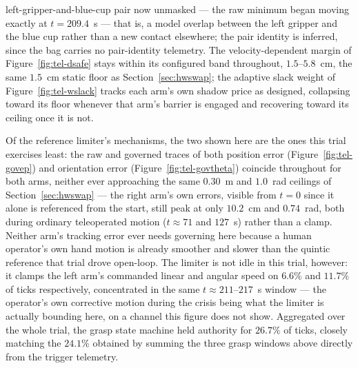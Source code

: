 \documentclass[12pt,a4paper,twoside,openright]{report}
\begin{document}
left-gripper-and-blue-cup pair now unmasked --- the raw minimum began moving exactly at $t=209.4$~s --- that is, a model overlap between the left gripper and the blue cup rather than a new contact elsewhere; the pair identity is inferred, since the bag carries no pair-identity telemetry. The velocity-dependent margin of Figure~\ref{fig:tel-dsafe} stays within its configured band throughout, $1.5$--$5.8$~cm, the same $1.5$~cm static floor as Section~\ref{sec:hwswap}; the adaptive slack weight of Figure~\ref{fig:tel-wslack} tracks each arm's own shadow price as designed, collapsing toward its floor whenever that arm's barrier is engaged and recovering toward its ceiling once it is not.

Of the reference limiter's mechanisms, the two shown here are the ones this trial exercises least: the raw and governed traces of both position error (Figure~\ref{fig:tel-govep}) and orientation error (Figure~\ref{fig:tel-govtheta}) coincide throughout for both arms, neither ever approaching the same $0.30$~m and $1.0$~rad ceilings of Section~\ref{sec:hwswap} --- the right arm's own errors, visible from $t=0$ since it alone is referenced from the start, still peak at only $10.2$~cm and $0.74$~rad, both during ordinary teleoperated motion ($t\approx71$ and $127$~s) rather than a clamp. Neither arm's tracking error ever needs governing here because a human operator's own hand motion is already smoother and slower than the quintic reference that trial drove open-loop. The limiter is not idle in this trial, however: it clamps the left arm's commanded linear and angular speed on $6.6\%$ and $11.7\%$ of ticks respectively, concentrated in the same $t\approx211$--$217$~s window --- the operator's own corrective motion during the crisis being what the limiter is actually bounding here, on a channel this figure does not show. Aggregated over the whole trial, the grasp state machine held authority for $26.7\%$ of ticks, closely matching the $24.1\%$ obtained by summing the three grasp windows above directly from the trigger telemetry.
\end{document}
